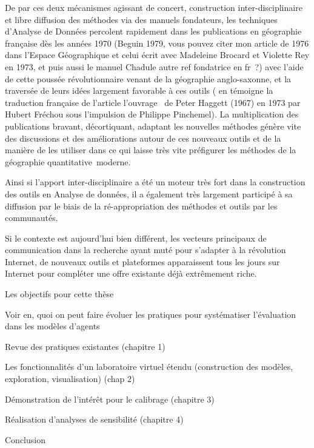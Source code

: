 De par ces deux mécanismes agissant de concert, construction inter-disciplinaire et libre diffusion des méthodes via des manuels fondateurs, les techniques d'Analyse de Données percolent rapidement dans les publications en géographie française dès les années 1970 (Beguin 1979, vous pouvez citer mon article de 1976 dans l’Espace Géographique et celui écrit avec Madeleine Brocard et Violette Rey en 1973, et puis aussi le manuel Chadule autre ref fondatrice en fr ?) avec l'aide de cette poussée révolutionnaire venant de la géographie anglo-saxonne, et la traversée de leurs idées largement favorable à ces outils ( en témoigne la traduction française de l'article l’ouvrage  de Peter Haggett (1967) en 1973 par Hubert Fréchou sous l’impulsion de Philippe Pinchemel). La multiplication des publications bravant, décortiquant, adaptant les nouvelles méthodes génère vite des discussions et des améliorations autour de ces nouveaux outils et de la manière de les utiliser dans ce qui laisse très vite préfigurer les méthodes de la géographie quantitative moderne.

Ainsi si l'apport inter-disciplinaire a été un moteur très fort dans la construction des outils en Analyse de données, il a également très largement participé à sa diffusion par le biais de la ré-appropriation des méthodes et outils par les communautés.

Si le contexte est aujourd'hui bien différent, les vecteurs principaux de communication dans la recherche ayant muté pour s'adapter à la révolution Internet, de nouveaux outils et plateformes apparaissent tous les jours sur Internet pour compléter une offre existante déjà extrêmement riche.


Les objectifs pour cette thèse

Voir en, quoi on peut faire évoluer les pratiques pour systématiser l’évaluation dans les modèles d’agents

Revue des pratiques existantes (chapitre 1)

Les fonctionnalités d’un laboratoire virtuel étendu (construction des modèles, exploration, visualisation) (chap 2)

Démonstration de l’intérêt pour le calibrage (chapitre 3)

Réalisation d’analyses de sensibilité (chapitre 4)

Conclusion



\listoftodos


